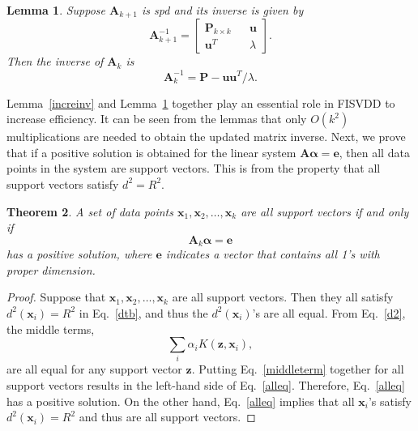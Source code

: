 \documentclass{article}
\newcommand{\eref}[1]{Eq.~\ref{#1}}
\newcommand{\lref}[1]{Lemma~\ref{#1}}
\newtheorem{theorem}{Theorem}
\newtheorem{lemma}[theorem]{Lemma}
\numberwithin{equation}{section}
\begin{document}
\begin{lemma}\label{decreinv}
Suppose $\mathbf{A}_{k+1}$ is spd and its inverse is given by
\begin{equation}
\mathbf{A}_{k+1}^{-1} = \begin{bmatrix}
\mathbf{P}_{k\times k} && \mathbf{u}\\
\mathbf{u}^T && \lambda
\end{bmatrix}.
\end{equation} 
Then the inverse of $\mathbf{A}_k$ is 
\begin{equation}\label{ak-1inv}
\mathbf{A}_{k}^{-1} = \mathbf{P} - \mathbf{u}\mathbf{u}^T/\lambda.
\end{equation}
\end{lemma}

\lref{increinv} and \lref{decreinv} together play an essential role in FISVDD to increase efficiency. It can be seen from the lemmas that only $O(k^2)$ multiplications are needed to obtain the updated matrix inverse. Next, we prove that if a positive solution is obtained for the linear system $\mathbf{A}\boldsymbol{\alpha} = \mathbf{e}$, then all data points in the system are support vectors. This is from the property that all support vectors satisfy $d^2 = R^2$.

\begin{theorem}\label{allsv}
A set of data points $\mathbf{x}_1,\mathbf{x}_2,\ldots,\mathbf{x}_k$ are all support vectors if and only if 
\begin{equation}\label{alleq}
\mathbf{A}_k\boldsymbol{\alpha} = \mathbf{e}
\end{equation}
has a positive solution, where $\mathbf{e}$ indicates a vector that contains all 1's with proper dimension.
\end{theorem}
\begin{proof}
Suppose that $\mathbf{x}_1,\mathbf{x}_2,\ldots,\mathbf{x}_k$ are all support vectors. Then they all satisfy $d^2(\mathbf{x}_i) = R^2$ in \eref{dtb}, and thus the $d^2(\mathbf{x}_i)$'s are all equal. From \eref{d2}, the middle terms, 
\begin{equation}\label{middleterm}
\sum_i\alpha_iK(\mathbf{z},\mathbf{x}_i),
\end{equation}
are all equal for any support vector $\mathbf{z}$. Putting \eref{middleterm} together for all support vectors results in the left-hand side of \eref{alleq}. Therefore, \eref{alleq} has a positive solution. On the other hand, \eref{alleq} implies that all $\mathbf{x}_i$'s satisfy $d^2(\mathbf{x}_i) = R^2$ and thus are all support vectors. 
\end{proof}
\end{document}
